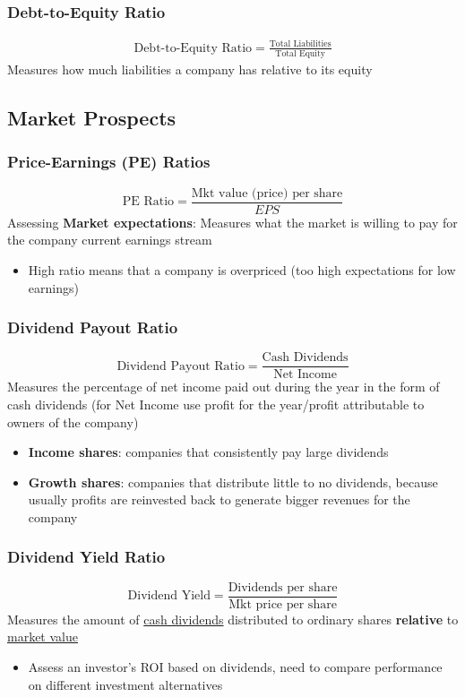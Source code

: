 \documentclass{article}
\begin{document}
\begin{multicols}{2}
\subsubsection{Debt-to-Equity Ratio}
\begin{equation*}
	\begin{aligned}
		\text{Debt-to-Equity Ratio} = \frac{\text{Total Liabilities}}{\text{Total Equity}}
	\end{aligned}
\end{equation*}
Measures how much liabilities a company has relative to its equity
\subsection{Market Prospects}
\subsubsection{Price-Earnings (PE) Ratios}
$$
\text{PE Ratio} = \frac{\text{Mkt value (price) per share}}{EPS}
$$
Assessing \textbf{Market expectations}: Measures what the market is willing to pay for the company current earnings stream
\begin{itemize}
	\item High ratio means that a company is overpriced (too high expectations for low earnings)
\end{itemize}

\subsubsection{Dividend Payout Ratio}
$$\text{Dividend Payout Ratio} = \frac{\text{Cash Dividends}}{\text{Net Income}}$$
Measures the percentage of net income paid out during the year in the form of cash dividends (for Net Income use profit for the year/profit attributable to owners of the company)
\begin{itemize}
	\item \textbf{Income shares}: companies that consistently pay large dividends
	\item \textbf{Growth shares}: companies that distribute little to no dividends, because usually profits are reinvested back to generate bigger revenues for the company
\end{itemize}

\subsubsection{Dividend Yield Ratio}
$$\text{Dividend Yield} = \frac{\text{Dividends per share}}{\text{Mkt price per share}}$$
Measures the amount of \underline{cash dividends} distributed to ordinary shares \textbf{relative} to \underline{market value}
\begin{itemize}
	\item Assess an investor's ROI based on dividends, need to compare performance on different investment alternatives
\end{itemize}


\end{multicols}
\end{document}
